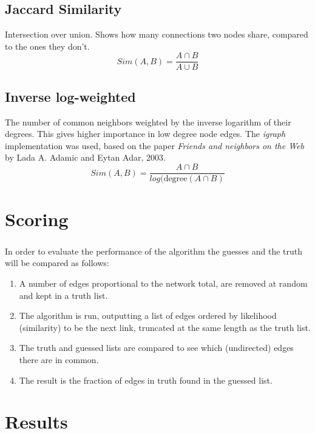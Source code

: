 \documentclass[12pt,a4paper]{report}
\begin{document}
\section{Jaccard Similarity}
Intersection over union. Shows how many connections two nodes share, compared to the ones they don't.
$$Sim(A,B)= \frac{A\cap B}{A\cup B}$$

\section{Inverse log-weighted}
The number of common neighbors weighted by the inverse logarithm of their degrees. This gives higher importance in low degree node edges. The \emph{igraph} implementation was used, based on the paper \emph{Friends and neighbors on the Web} by Lada A. Adamic and Eytan Adar, 2003.
$$Sim(A,B)=\frac{A \cap B}{log(\text{degree}(A \cap B)}$$

\chapter{Scoring} 
\paragraph{} In order to evaluate the performance of the algorithm the guesses and the truth will be compared as follows:
\begin{enumerate}
\item A number of edges proportional to the network total, are removed at random and kept in a truth list.
\item The algorithm is run, outputting a list of edges ordered by likelihood (similarity) to be the next link, truncated at the same length as the truth list.
\item The truth and guessed lists are compared to see which (undirected) edges there are in common.
\item The result is the fraction of edges in truth found in the guessed list.
\end{enumerate}

\chapter{Results}
\end{document}
